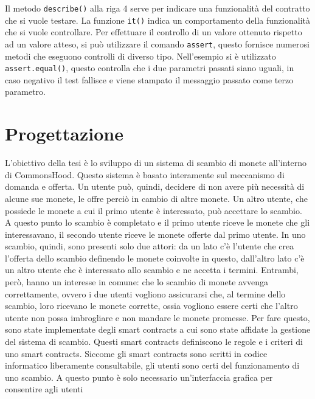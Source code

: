 \documentclass[a4paper]{article}
\begin{document}
        Il metodo \verb|describe()| alla riga 4 serve per indicare una funzionalità del contratto che si vuole testare.
        La funzione \verb|it()| indica un comportamento della funzionalità che si vuole controllare.
        \newline
        Per effettuare il controllo di un valore ottenuto rispetto ad un valore atteso, si può utilizzare il comando \verb|assert|, questo fornisce numerosi metodi che eseguono controlli di diverso tipo.
        Nell'esempio si è utilizzato \verb|assert.equal()|, questo controlla che i due parametri passati siano uguali, in caso negativo il test fallisce e viene stampato il messaggio passato come terzo parametro.
        \newpage

        \section{Progettazione}
        L'obiettivo della tesi è lo sviluppo di un sistema di scambio di monete all'interno di CommonsHood. Questo sistema è basato interamente sul meccanismo di domanda e offerta.
        Un utente può, quindi, decidere di non avere più necessità di alcune sue monete, le offre perciò in cambio di altre monete. Un altro utente, che possiede le monete a cui il primo utente è interessato, può accettare lo scambio.
        A questo punto lo scambio è completato e il primo utente riceve le monete che gli interessavano, il secondo utente riceve le monete offerte dal primo utente. In uno scambio, quindi, sono presenti solo due attori:
        da un lato c'è l'utente che crea l'offerta dello scambio definendo le monete coinvolte in questo, dall'altro lato c'è un altro utente che è interessato allo scambio e ne accetta i termini.
        Entrambi, però, hanno un interesse in comune: che lo scambio di monete avvenga correttamente, ovvero i due utenti vogliono assicurarsi che, al termine dello scambio, loro ricevano le monete corrette, ossia vogliono essere certi che l'altro utente
        non possa imbrogliare e non mandare le monete promesse.
        \newline
        Per fare questo, sono state implementate degli smart contracts a cui sono state affidate la gestione del sistema di scambio. Questi smart contracts definiscono le regole e i criteri di uno smart contracts.
        Siccome gli smart contracts sono scritti in codice informatico liberamente consultabile, gli utenti sono certi del funzionamento di uno scambio. A questo punto è solo necessario un'interfaccia grafica per consentire agli utenti
\end{document}
